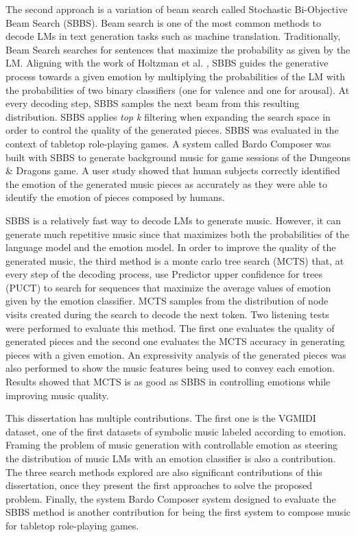 The second approach is a variation of beam search called Stochastic Bi-Objective Beam Search (SBBS). Beam search is one of the most common methods to decode LMs in text generation tasks such as machine translation. Traditionally, Beam Search searches for sentences that maximize the probability as given by the LM. Aligning with the work of Holtzman et al. \cite{holtzman2018learning}, SBBS guides the generative process towards a given emotion by multiplying the probabilities of the LM with the probabilities of two binary classifiers (one for valence and one for arousal). At every decoding step, SBBS samples the next beam from this resulting distribution. SBBS applies \textit{top k} filtering when expanding the search space in order to control the quality of the generated pieces. SBBS was evaluated in the context of tabletop role-playing games. A system called Bardo Composer was built with SBBS to generate background music for game sessions of the Dungeons \& Dragons game. A user study showed that human subjects correctly identified the emotion of the generated music pieces as accurately as they were able to identify the emotion of pieces composed by humans.

SBBS is a relatively fast way to decode LMs to generate music. However, it can generate much repetitive music since that maximizes both the probabilities of the language model and the emotion model. In order to improve the quality of the generated music, the third method is a monte carlo tree search (MCTS) that, at every step of the decoding process, use Predictor upper confidence for trees (PUCT) to search for sequences that maximize the average values of emotion given by the emotion classifier. MCTS samples from the distribution of node visits created during the search to decode the next token. Two listening tests were performed to evaluate this method. The first one evaluates the quality of generated pieces and the second one evaluates the MCTS accuracy in generating pieces with a given emotion. An expressivity analysis of the generated pieces was also performed to show the music features being used to convey each emotion. Results showed that MCTS is as good as SBBS  in controlling emotions while improving music quality.

This dissertation has multiple contributions. The first one is the VGMIDI dataset, one of the first datasets of symbolic music labeled according to emotion. Framing the problem of music generation with controllable emotion as steering the distribution of music LMs with an emotion classifier is also a contribution. The three search methods explored are also significant contributions of this dissertation, once they present the first approaches to solve the proposed problem. Finally, the system Bardo Composer system designed to evaluate the SBBS method is another contribution for being the first system to compose music for tabletop role-playing games.

